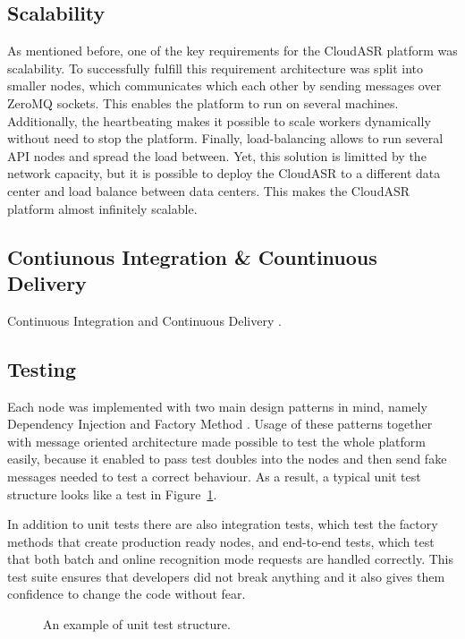 \subsection{Scalability}
As mentioned before, one of the key requirements for the CloudASR platform was scalability.
To successfully fulfill this requirement architecture was split into smaller nodes,
  which communicates which each other by sending messages over ZeroMQ sockets.
This enables the platform to run on several machines.
Additionally, the heartbeating makes it possible to scale workers dynamically without need to stop the platform.
Finally, load-balancing allows to run several API nodes and spread the load between.
Yet, this solution is limitted by the network capacity,
  but it is possible to deploy the CloudASR to a different data center
  and load balance between data centers.
This makes the CloudASR platform almost infinitely scalable.


\subsection{Contiunous Integration \& Countinuous Delivery}
Continuous Integration \cite{fowler2006continuous} and Continuous Delivery \cite{humble2010continuous}.


\BLIND

\subsection{Testing}
Each node was implemented with two main design patterns in mind, namely Dependency Injection \cite{fowler2004inversion} and Factory Method \cite{gamma1993design}.
Usage of these patterns together with message oriented architecture made possible to test the whole platform easily,
  because it enabled to pass test doubles into the nodes
  and then send fake messages needed to test a correct behaviour.
As a result, a typical unit test structure looks like a test in Figure~\ref{fig:unit-test}.

In addition to unit tests there are also integration tests,
  which test the factory methods that create production ready nodes,
  and end-to-end tests,
  which test that both batch and online recognition mode requests are handled correctly.
This test suite ensures that developers did not break anything
  and it also gives them confidence to change the code without fear.

\begin{figure}[h]
  

  \caption{An example of unit test structure.}
  \label{fig:unit-test}
\end{figure}


